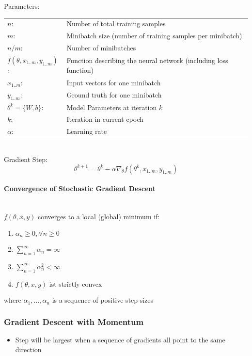 \documentclass[10pt,a4paper]{article}
\begin{document}
Parameters: \\
\begin{tabular}{ll}
	$n$: & Number of total training samples \\
	$m$: & Minibatch size (number of training samples per minibatch) \\
	$n/m$: & Number of minibatches \\
	$f(\theta, x_{1..m}, y_{1..m})$: & Function describing the neural network (including loss function) \\
	$x_{1..m}$: & Input vectors for one minibatch \\
	$y_{1..m}$: & Ground truth for one minibatch \\
	$\theta^k = \{W, b\}$: & Model Parameters at iteration $k$\\
	$k$: & Iteration in current epoch \\
	$\alpha$: & Learning rate
\end{tabular} \\

Gradient Step:
$$
	\theta^{k + 1} = \theta^k - \alpha \nabla_\theta f(\theta^k, x_{1..m}, y_{1..m})
$$

\paragraph{Convergence of Stochastic Gradient Descent} ~\\
$f(\theta, x, y)$ converges to a local (global) minimum if:
\begin{enumerate}
	\item $\alpha_n ≥ 0, \forall n ≥ 0$
	\item $\sum_{n = 1}^∞ \alpha_n = ∞$
	\item $\sum_{n = 1}^∞ \alpha_n^2 < ∞$
	\item $f(\theta, x, y)$ ist strictly convex
\end{enumerate}
where $\alpha_1, \dots, \alpha_n$ is a sequence of positive step-sizes

\subsubsection{Gradient Descent with Momentum}
\begin{itemize}
	\item Step will be largest when a sequence of gradients all point to the same direction
\end{itemize}
\end{document}
